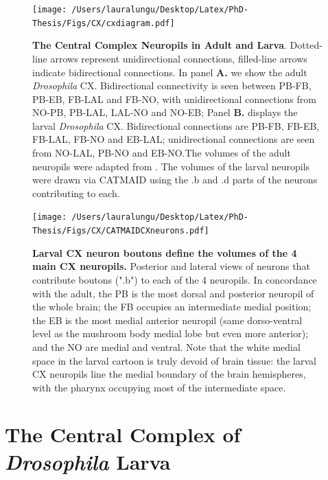     \begin{figure}
        \centering
        \texttt{[image: /Users/lauralungu/Desktop/Latex/PhD-Thesis/Figs/CX/cxdiagram.pdf]}
        \caption[The Central Complex Neuropils in Adult and Larva]{\textbf{The Central Complex Neuropils in Adult and Larva}. Dotted-line arrows represent unidirectional connections, filled-line arrows indicate bidirectional connections. In panel \textbf{A.} we show the adult \textit{\textit{Drosophila}} CX. Bidirectional connectivity is seen between PB-FB, PB-EB, FB-LAL and FB-NO, with unidirectional connections from NO-PB, PB-LAL, LAL-NO and NO-EB; Panel \textbf{B.} displays the larval \textit{Drosophila} CX. Bidirectional connections are  PB-FB, FB-EB, FB-LAL, FB-NO and EB-LAL; unidirectional connections are seen from NO-LAL, PB-NO and EB-NO.The volumes of the adult neuropils were adapted from \citep{franconville2018building}.
        The volumes of the larval neuropils were drawn via CATMAID using the .b and .d parts of the neurons contributing to each.}
        \label{cxdiagram}
    \end{figure}

    \begin{figure}
        \centering
        \texttt{[image: /Users/lauralungu/Desktop/Latex/PhD-Thesis/Figs/CX/CATMAIDCXneurons.pdf]}
        \caption[Larval CX neuron boutons define the volumes of the 4 main CX neuropils]{\textbf{Larval CX neuron boutons define the volumes of the 4 main CX neuropils.} Posterior and lateral views of neurons that contribute boutons (".b") to each of the 4 neuropils. In concordance with the adult, the PB is the most dorsal and posterior neuropil of the whole brain; the FB occupies an intermediate medial position; the EB is the most medial anterior neuropil (same dorso-ventral level as the mushroom body medial lobe but even more anterior); and the NO are medial and ventral. Note that the white medial space in the larval cartoon is truly devoid of brain tissue: the larval CX neuropils line the medial boundary of the brain hemispheres, with the pharynx occupying most of the intermediate space.
        }
        \label{cxdiagram}
    \end{figure}    

\section{The Central Complex of \textit{Drosophila} Larva}
